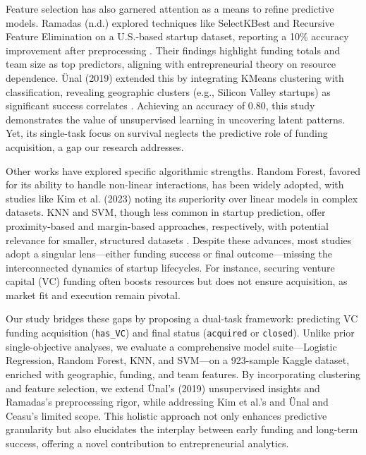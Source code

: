 \documentclass[conference]{IEEEtran}
\begin{document}
    Feature selection has also garnered attention as a means to refine predictive models. Ramadas (n.d.) explored techniques like SelectKBest and Recursive Feature Elimination on a U.S.-based startup dataset, reporting a 10\% accuracy improvement after preprocessing \cite{proquest}. Their findings highlight funding totals and team size as top predictors, aligning with entrepreneurial theory on resource dependence. Ünal (2019) extended this by integrating KMeans clustering with classification, revealing geographic clusters (e.g., Silicon Valley startups) as significant success correlates \cite{edoc}. Achieving an accuracy of 0.80, this study demonstrates the value of unsupervised learning in uncovering latent patterns. Yet, its single-task focus on survival neglects the predictive role of funding acquisition, a gap our research addresses.

    Other works have explored specific algorithmic strengths. Random Forest, favored for its ability to handle non-linear interactions, has been widely adopted, with studies like Kim et al. (2023) noting its superiority over linear models in complex datasets. KNN and SVM, though less common in startup prediction, offer proximity-based and margin-based approaches, respectively, with potential relevance for smaller, structured datasets \cite{investopedia}. Despite these advances, most studies adopt a singular lens—either funding success or final outcome—missing the interconnected dynamics of startup lifecycles. For instance, securing venture capital (VC) funding often boosts resources but does not ensure acquisition, as market fit and execution remain pivotal.

    Our study bridges these gaps by proposing a dual-task framework: predicting VC funding acquisition (\texttt{has\_VC}) and final status (\texttt{acquired} or \texttt{closed}). Unlike prior single-objective analyses, we evaluate a comprehensive model suite—Logistic Regression, Random Forest, KNN, and SVM—on a 923-sample Kaggle dataset, enriched with geographic, funding, and team features. By incorporating clustering and feature selection, we extend Ünal’s (2019) unsupervised insights and Ramadas’s preprocessing rigor, while addressing Kim et al.’s and Ünal and Ceasu’s limited scope. This holistic approach not only enhances predictive granularity but also elucidates the interplay between early funding and long-term success, offering a novel contribution to entrepreneurial analytics.
\end{document}
